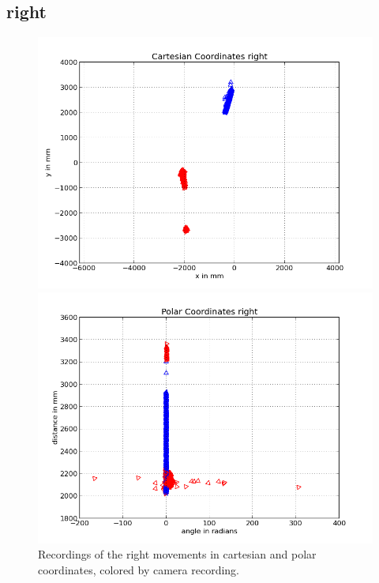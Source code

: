 \documentclass{scrartcl}
\begin{document}
\subsection{right}
\begin{figure}[H]
\centering
\begin{minipage}{.5\textwidth}
  \centering
  \includegraphics[width=.8\linewidth]{img/right_n.png}
\end{minipage}%
\begin{minipage}{.5\textwidth}
  \centering
  \includegraphics[width=.8\linewidth]{img/right_pc_n.png}
\end{minipage}
\caption{Recordings of the right movements in cartesian and polar coordinates, colored by camera recording.}
\label{fig:right}
\end{figure}
\end{document}
